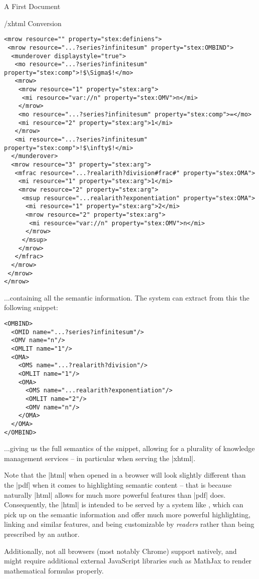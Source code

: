 \begin{sfragment}{A First \sTeX Document}
\begin{sfragment}{\omdoc/xhtml Conversion}
\begin{lstlisting}[escapechar=!,
morekeywords={property,resource,stex:comp,stex:arg,stex:OMA,stex:OMV}]
<mrow resource="" property="stex:definiens">
 <mrow resource="...?series?infinitesum" property="stex:OMBIND">
  <munderover displaystyle="true">
   <mo resource="...?series?infinitesum" property="stex:comp">!$\Sigma$!</mo>
   <mrow>
    <mrow resource="1" property="stex:arg">
     <mi resource="var://n" property="stex:OMV">n</mi>
    </mrow>
    <mo resource="...?series?infinitesum" property="stex:comp">=</mo>
    <mi resource="2" property="stex:arg">1</mi>
   </mrow>
   <mi resource="...?series?infinitesum" property="stex:comp">!$\infty$!</mi>
  </munderover>
  <mrow resource="3" property="stex:arg">
   <mfrac resource="...?realarith?division#frac#" property="stex:OMA">
    <mi resource="1" property="stex:arg">1</mi>
    <mrow resource="2" property="stex:arg">
     <msup resource="...realarith?exponentiation" property="stex:OMA">
      <mi resource="1" property="stex:arg">2</mi>
      <mrow resource="2" property="stex:arg">
       <mi resource="var://n" property="stex:OMV">n</mi>
      </mrow>
     </msup>
    </mrow>
   </mfrac>
  </mrow>
 </mrow>
</mrow>
      \end{lstlisting}
      ...containing all the semantic information. The \mmt system
      can extract from this the following \openmath snippet:

      \begin{lstlisting}[escapechar=!]
<OMBIND>
  <OMID name="...?series?infinitesum"/>
  <OMV name="n"/>
  <OMLIT name="1"/>
  <OMA>
    <OMS name="...?realarith?division"/>
    <OMLIT name="1"/>
    <OMA>
      <OMS name="...realarith?exponentiation"/>
      <OMLIT name="2"/>
      <OMV name="n"/>
    </OMA>
  </OMA>
</OMBIND>
      \end{lstlisting}
      ...giving us the full semantics of the snippet, allowing for
      a plurality of knowledge management services -- in particular
      when serving the |xhtml|.

      \begin{remark}
          Note that the |html| when opened in a browser will
          look slightly different than the |pdf| when it comes
          to highlighting semantic content -- that is because
          naturally |html| allows for much more powerful
          features than |pdf| does. Consequently, the |html|
          is intended to be served by a system like \mmt,
          which can pick up on the semantic information and
          offer much more powerful highlighting, linking
          and similar features, and being customizable by
          \emph{readers} rather than being prescribed by an author.

          Additionally, not all browsers (most notably Chrome)
          support \mathml natively, and might require
          additional external JavaScript libraries such as
          MathJax to render mathematical formulas properly.
      \end{remark}
    \end{sfragment}
\end{sfragment}


